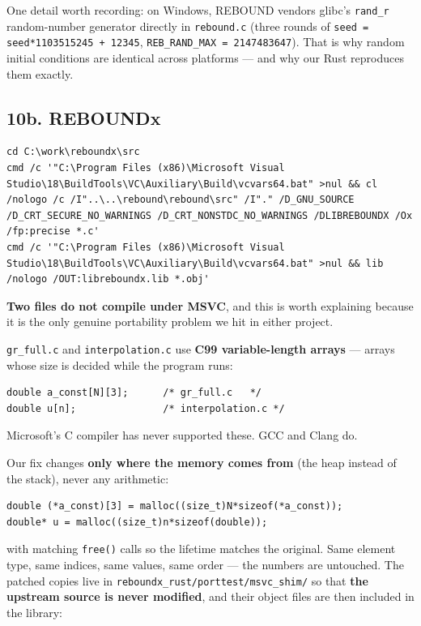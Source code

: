 \documentclass[11pt]{article}
\begin{document}
One detail worth recording: on Windows, REBOUND vendors glibc's \texttt{rand\_r} random-number generator directly in \texttt{rebound.c} (three rounds of \texttt{seed = seed*1103515245 + 12345}, \texttt{REB\_RAND\_MAX = 2147483647}). That is why random initial conditions are identical across platforms --- and why our Rust reproduces them exactly.

\subsection{10b. REBOUNDx}

\begin{lstlisting}
cd C:\work\reboundx\src
cmd /c '"C:\Program Files (x86)\Microsoft Visual Studio\18\BuildTools\VC\Auxiliary\Build\vcvars64.bat" >nul && cl /nologo /c /I"..\..\rebound\rebound\src" /I"." /D_GNU_SOURCE /D_CRT_SECURE_NO_WARNINGS /D_CRT_NONSTDC_NO_WARNINGS /DLIBREBOUNDX /Ox /fp:precise *.c'
cmd /c '"C:\Program Files (x86)\Microsoft Visual Studio\18\BuildTools\VC\Auxiliary\Build\vcvars64.bat" >nul && lib /nologo /OUT:libreboundx.lib *.obj'
\end{lstlisting}

\textbf{Two files do not compile under MSVC}, and this is worth explaining because it is the only genuine portability problem we hit in either project.

\texttt{gr\_full.c} and \texttt{interpolation.c} use \textbf{C99 variable-length arrays} --- arrays whose size is decided while the program runs:

\begin{lstlisting}
double a_const[N][3];      /* gr_full.c   */
double u[n];               /* interpolation.c */
\end{lstlisting}

Microsoft's C compiler has never supported these. GCC and Clang do.

Our fix changes \textbf{only where the memory comes from} (the heap instead of the stack), never any arithmetic:

\begin{lstlisting}
double (*a_const)[3] = malloc((size_t)N*sizeof(*a_const));
double* u = malloc((size_t)n*sizeof(double));
\end{lstlisting}

with matching \texttt{free()} calls so the lifetime matches the original. Same element type, same indices, same values, same order --- the numbers are untouched. The patched copies live in \texttt{reboundx\_rust/porttest/msvc\_shim/} so that \textbf{the upstream source is never modified}, and their object files are then included in the library:
\end{document}

